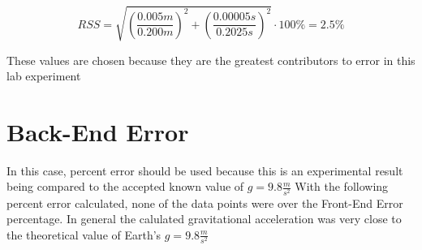 \begin{equation*}
  RSS = \sqrt{\left( \frac{0.005m}{0.200m} \right)^2 + \left( \frac{0.00005s}{0.2025s} \right)^2} \cdot 100\% = 2.5\%
\end{equation*}

These values are chosen because they are the greatest contributors to error in 
this lab experiment




\section{Back-End Error}

In this case, percent error should be used because this is an experimental
result being compared to the accepted known value of $g = 9.8\frac{m}{s^2}$
With the following percent error calculated, none of the data points were over 
the Front-End Error percentage. In general the calulated gravitational acceleration
was very close to the theoretical value of Earth's $g = 9.8\frac{m}{s^2}$ 


